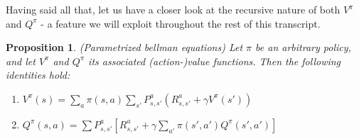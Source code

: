 \documentclass[11pt]{article} %
\newtheorem{prop}{Proposition}
\begin{document}
Having said all that, let us have a closer look at the recursive nature of both $V^{\pi}$ and $Q^{\pi}$ - a feature we will exploit throughout the rest of this transcript.

\begin{prop}{(Parametrized bellman equations)}
	Let $\pi$ be an arbitrary policy, and let $V^{\pi}$ and $Q^{\pi}$ its associated (action-)value functions. Then the following identities hold:
	\begin{enumerate}
		\item $V^{\pi}(s) = \sum_{a} \pi(s,a) \sum_{s'} P_{s,s'}^a ( R_{s,s'}^a + \gamma V^{\pi}(s') ) $
		\item $Q^{\pi}(s,a) = \sum P_{s,s'}^a [ R_{s,s'}^a + \gamma \sum_{a'} \pi(s',a') Q^{\pi}(s',a') ] $
	\end{enumerate}
\end{prop}
\end{document}

